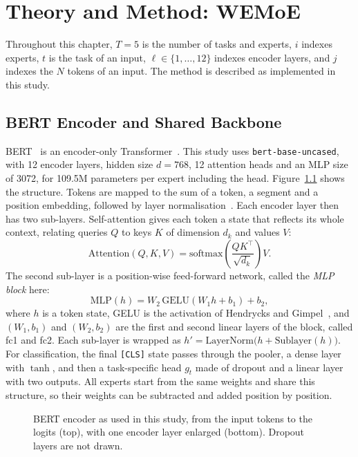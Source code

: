 \chapter{Theory and Method: WEMoE}
\label{ch:theory}

Throughout this chapter, $T=5$ is the number of tasks and experts, $i$ indexes experts, $t$ is the task of an input, $\ell\in\{1,\dots,12\}$ indexes encoder layers, and $j$ indexes the $N$ tokens of an input. The method is described as implemented in this study.

\section{BERT Encoder and Shared Backbone}

BERT~\cite{devlin2019bert} is an encoder-only Transformer~\cite{vaswani2017attention}. This study uses \texttt{bert-base-uncased}, with 12 encoder layers, hidden size $d=768$, 12 attention heads and an MLP size of 3072, for 109.5M parameters per expert including the head. Figure~\ref{fig:bert} shows the structure. Tokens are mapped to the sum of a token, a segment and a position embedding, followed by layer normalisation~\cite{ba2016layernorm}. Each encoder layer then has two sub-layers. Self-attention gives each token a state that reflects its whole context, relating queries $Q$ to keys $K$ of dimension $d_k$ and values $V$:
\begin{equation}
\mathrm{Attention}(Q,K,V)=\mathrm{softmax}\!\left(\frac{QK^{\top}}{\sqrt{d_k}}\right)V .
\label{eq:attention}
\end{equation}
The second sub-layer is a position-wise feed-forward network, called the \emph{MLP block} here:
\begin{equation}
\mathrm{MLP}(h)=W_2\,\mathrm{GELU}(W_1h+b_1)+b_2 ,
\label{eq:ffn}
\end{equation}
where $h$ is a token state, GELU is the activation of Hendrycks and Gimpel~\cite{hendrycks2016gelu}, and $(W_1,b_1)$ and $(W_2,b_2)$ are the first and second linear layers of the block, called fc1 and fc2. Each sub-layer is wrapped as $h'=\mathrm{LayerNorm}\big(h+\mathrm{Sublayer}(h)\big)$. For classification, the final \texttt{[CLS]} state passes through the pooler, a dense layer with $\tanh$, and then a task-specific head $g_t$ made of dropout and a linear layer with two outputs. All experts start from the same weights and share this structure, so their weights can be subtracted and added position by position.

\begin{figure}[htbp]
  \centering
  \resizebox{.82\linewidth}{!}{}
  \caption{BERT encoder as used in this study, from the input tokens to the logits (top), with one encoder layer enlarged (bottom). Dropout layers are not drawn.}
  \label{fig:bert}
\end{figure}

